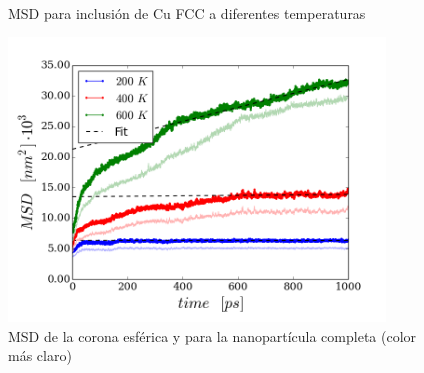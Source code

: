 \documentclass[10pt, oneside]{article} %
\begin{document}
\begin{figure}[H]
\centering
{}
\\
\caption[MSD para inclusión de Cu FCC a diferentes temperaturas]{MSD para inclusión de Cu FCC a diferentes temperaturas}
\label{C4:fg:msd_Cu_FCC}
\end{figure}

\begin{figure}[H]
\centering
\includegraphics[width=10cm]{../Figures/Cap_4/FCCdiff_shell_comp.png}
\caption[MSD de la corona esférica y la nanopartícula completa]{MSD de la corona esférica y para la nanopartícula completa (color más claro)}
\label{C4:fg:FCCdiff_shell_comp}
\end{figure}
\end{document}
